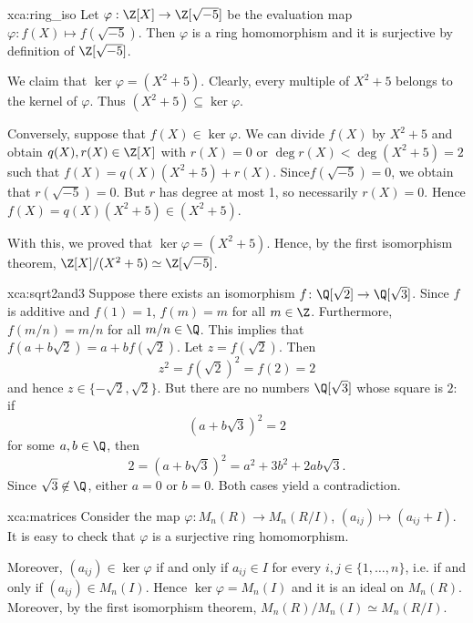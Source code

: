 \begin{sol}{xca:ring_iso}
Let
$\varphi:\Z[X]\to \Z[\sqrt{-5}]$ be the evaluation map
$\varphi:f(X)\mapsto f(\sqrt{-5})$.
Then $\varphi$ is a ring homomorphism and it is surjective by definition of $\Z[\sqrt{-5}]$.

We claim that $\ker\varphi=(X^2+5)$.
Clearly, every multiple of $X^2+5$ belongs to the kernel of $\varphi$.
Thus $(X^2+5)\subseteq \ker\varphi$.

Conversely, suppose that $f(X)\in \ker\varphi$.
We can divide $f(X)$ by $X^2+5$ and obtain $q(X),r(X)\in\Z[X]$ with $r(X)=0$ or $\deg r(X)<\deg (X^2+5)=2$ such that
$f(X)=q(X)(X^2+5)+r(X)$.
Since$f(\sqrt{-5})=0$, we obtain that $r(\sqrt{-5})=0$. 
But $r$ has degree at most 1, so necessarily $r(X)=0$.
Hence $f(X)=q(X)(X^2+5)\in (X^2+5)$.

With this, we proved that $\ker\varphi=(X^2+5)$.
Hence, by the first isomorphism theorem, 
$\Z[X]/(X^2+5)\simeq \Z[\sqrt{-5}]$.
\end{sol}

\begin{sol}{xca:sqrt2and3}
Suppose there exists an isomorphism $f\colon \Q[\sqrt{2}]\to\Q[\sqrt{3}]$. 
Since $f$ is additive and $f(1)=1$, $f(m)=m$ for all $m\in\Z$. Furthermore,
$f(m/n)=m/n$ for all $m/n\in\Q$. This implies that $f(a+b\sqrt{2})=a+bf(\sqrt{2})$. 
Let $z=f(\sqrt{2})$. Then 
\[
z^2=f(\sqrt{2})^2=f(2)=2
\]
and hence $z\in\{-\sqrt{2},\sqrt{2}\}$. But there are no numbers 
$\Q[\sqrt{3}]$ whose square is $2$: if \[
\left(a+b\sqrt{3}\right)^2=2
\]
for some
$a,b\in\Q$, then 
\[
2=\left(a+b\sqrt{3}\right)^2=a^2+3b^2+2ab\sqrt{3}.
\]
Since $\sqrt{3}\not\in\Q$, either $a=0$ or $b=0$. Both cases yield 
a contradiction. 
\end{sol}

\begin{sol}{xca:matrices}
Consider the map 
$\varphi: M_n(R)\to M_n(R/I)$, $(a_{ij})\mapsto (a_{ij}+I)$.
It is easy to check that $\varphi$ 
is a surjective ring homomorphism.

Moreover, $(a_{ij})\in\ker\varphi$ 
if and only if $a_{ij}\in I$ for every $i,j\in\{1,\dots, n\}$, i.e. if and only if $(a_{ij})\in M_n(I)$.
Hence $\ker\varphi = M_n(I)$ and it is an ideal on $M_n(R)$.
Moreover, by the first isomorphism theorem, $M_n(R)/M_n(I)\simeq M_n(R/I)$.
\end{sol}

